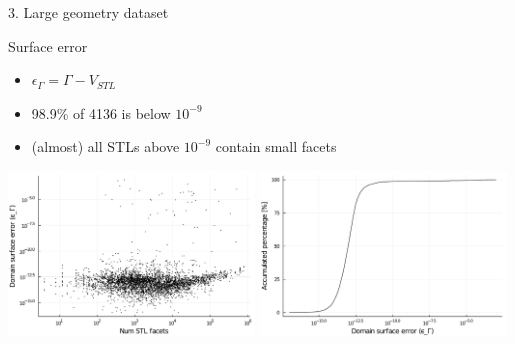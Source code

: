 \documentclass{beamer}
\begin{document}
\begin{frame}{3. Large geometry dataset}

  \begin{block}{Surface error}
  \begin{itemize}
    \item
      $\epsilon_\Gamma = \Gamma - V_{STL}$
    \item
      98.9\% of 4136 is below $10^{-9}$
    \item
      (almost) all STLs above $10^{-9}$ contain small facets
  \end{itemize}
  \end{block}

  \includegraphics[width=0.49\textwidth]{../analysis/plots/num_stl_facets_surface_error}
  \includegraphics[width=0.49\textwidth]{../analysis/plots/histogram_surface_error}
\end{frame}
\end{document}
